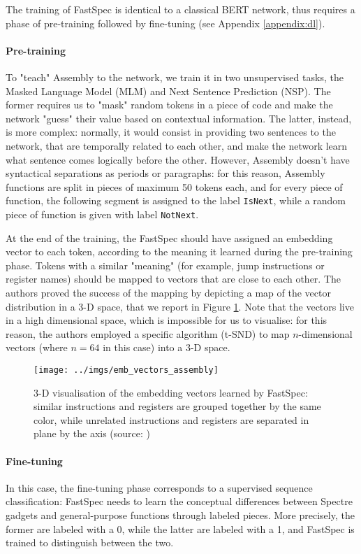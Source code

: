 \documentclass[12pt,a4paper]{book}
\theoremstyle{definition}
\begin{document}
	The training of FastSpec is identical to a classical BERT network, thus requires a phase of pre-training followed by fine-tuning (see Appendix \ref{appendix:dl}).
	
	\paragraph{Pre-training} To "teach" Assembly to the network, we train it in two unsupervised tasks, the Masked Language Model (MLM) and Next Sentence Prediction (NSP). The former requires us to "mask" random tokens in a piece of code and make the network "guess" their value based on contextual information. The latter, instead, is more complex: normally, it would consist in providing two sentences to the network, that are temporally related to each other, and make the network learn what sentence comes logically before the other. However, Assembly doesn't have syntactical separations as periods or paragraphs: for this reason, Assembly functions are split in pieces of maximum 50 tokens each, and for every piece of function, the following segment is assigned to the label \texttt{IsNext}, while a random piece of function is given with label \texttt{NotNext}.
	
	At the end of the training, the FastSpec should have assigned an embedding vector to each token, according to the meaning it learned during the pre-training phase. Tokens with a similar "meaning" (for example, jump instructions or register names) should be mapped to vectors that are close to each other. The authors proved the success of the mapping by depicting a map of the vector distribution in a 3-D space, that we report in Figure \ref{fig:emb_vec}. Note that the vectors live in a high dimensional space, which is impossible for us to visualise: for this reason, the authors employed a specific algorithm (t-SND) to map $n$-dimensional vectors (where $n = 64$ in this case) into a 3-D space.
	 
	\begin{figure}[!h] 
		\centering
		\texttt{[image: ../imgs/emb\_vectors\_assembly]}
		\captionsetup{width=.7\linewidth}
		\caption{3-D visualisation of the embedding vectors learned by FastSpec: similar instructions and registers are grouped together by the same color, while unrelated instructions and registers are separated in plane by the axis (source: \cite{Tol2021})}
		\label{fig:emb_vec}
	\end{figure}
	
	\paragraph{Fine-tuning} In this case, the fine-tuning phase corresponds to a supervised sequence classification: FastSpec needs to learn the conceptual differences between Spectre gadgets and general-purpose functions through labeled pieces. More precisely, the former are labeled with a 0, while the latter are labeled with a 1, and FastSpec is trained to distinguish between the two.
\end{document}
